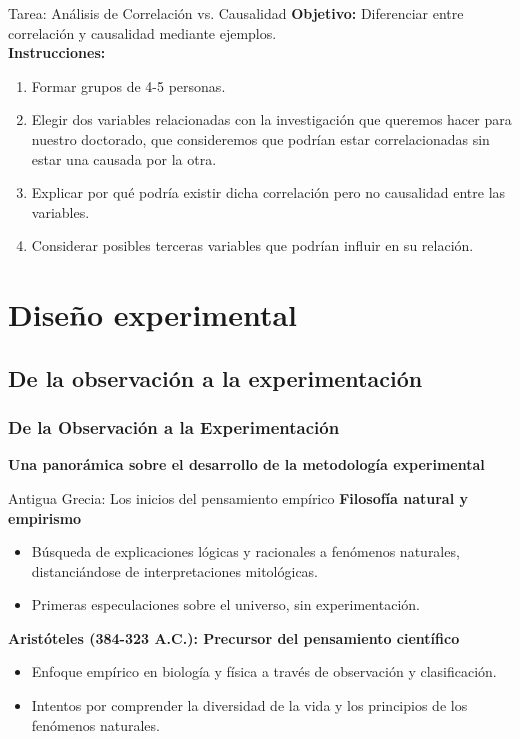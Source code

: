 ﻿\documentclass{beamer}
\begin{document}
\begin{frame}{Tarea: Análisis de Correlación vs. Causalidad}
    \textbf{Objetivo:} Diferenciar entre correlación y causalidad mediante ejemplos.\\[10pt]
    \textbf{Instrucciones:}
    \begin{enumerate}
        \item Formar grupos de 4-5 personas.
        \item Elegir dos variables relacionadas con la investigación que queremos hacer para nuestro doctorado, que consideremos que podrían estar correlacionadas sin estar una causada por la otra.
        \item Explicar por qué podría existir dicha correlación pero no causalidad entre las variables.
        \item Considerar posibles terceras variables que podrían influir en su relación.
    \end{enumerate}
\end{frame}

\section{Diseño experimental}

\subsection{De la observación a la experimentación}

\begin{frame}
    \frametitle{De la Observación a la Experimentación}
    \centering
    \textbf{\Large Una panorámica sobre el desarrollo de la metodología experimental}
    \vspace{0.5cm}
\end{frame}

\begin{frame}{Antigua Grecia: Los inicios del pensamiento empírico}
    \textbf{Filosofía natural y empirismo}
    \begin{itemize}
        \item Búsqueda de explicaciones lógicas y racionales a fenómenos naturales, distanciándose de interpretaciones mitológicas.
        \item Primeras especulaciones sobre el universo, sin experimentación.
    \end{itemize}
  
    \textbf{Aristóteles (384-323 A.C.): Precursor del pensamiento científico}
    \begin{itemize}
        \item Enfoque empírico en biología y física a través de observación y clasificación.
        \item Intentos por comprender la diversidad de la vida y los principios de los fenómenos naturales.
    \end{itemize}
\end{frame}
\end{document}
